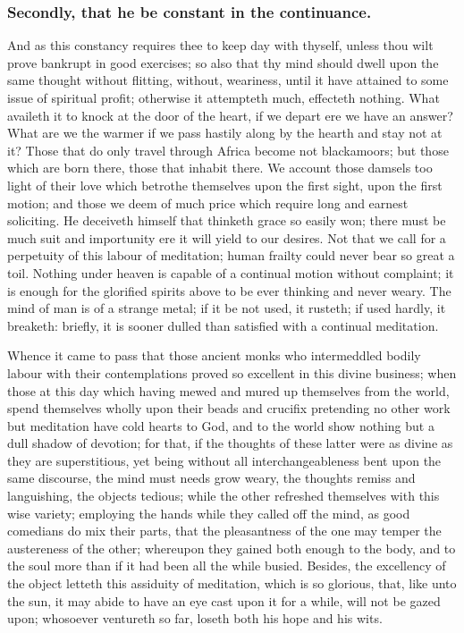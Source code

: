 \subsubsection{Secondly, that he be constant in the continuance.}
And as this constancy requires thee to keep day with thyself, unless thou wilt prove bankrupt in good exercises; so also that thy mind should dwell upon the same thought without flitting, without, weariness, until it have attained to some issue of spiritual profit; otherwise it attempteth much, effecteth nothing. What availeth it to knock at the door of the heart, if we depart ere we have an answer? What are we the warmer if we pass hastily along by the hearth and stay not at it? Those that do only travel through Africa become not blackamoors; but those which are born there, those that inhabit there. We account those damsels too light of their love which betrothe themselves upon the first sight, upon the first motion; and those we deem of much price which require long and earnest soliciting. He deceiveth himself that thinketh grace so easily won; there must be much suit and importunity ere it will yield to our desires. Not that we call for a perpetuity of this labour of meditation; human frailty could never bear so great a toil. Nothing under heaven is capable of a continual motion without complaint; it is enough for the glorified spirits above to be ever thinking and never weary. The mind of man is of a strange metal; if it be not used, it rusteth; if used hardly, it breaketh: briefly, it is sooner dulled than satisfied with a continual meditation. 

Whence it came to pass that those ancient monks who intermeddled bodily labour with their contemplations proved so excellent in this divine business; when those at this day which having mewed and mured up themselves from the world, spend themselves wholly upon their beads and crucifix pretending no other work but meditation have cold hearts to God, and to the world show nothing but a dull shadow of devotion; for that, if the thoughts of these latter were as divine as they are superstitious, yet being without all interchangeableness bent upon the same discourse, the mind must needs grow weary, the thoughts remiss and languishing, the objects tedious; while the other refreshed themselves with this wise variety; employing the hands while they called off the mind, as good comedians do mix their parts, that the pleasantness of the one may temper the austereness of the other; whereupon they gained both enough to the body, and to the soul more than if it had been all the while busied. Besides, the excellency of the object letteth this assiduity of meditation, which is so glorious, that, like unto the sun, it may abide to have an eye cast upon it for a while, will not be gazed upon; whosoever ventureth so far, loseth both his hope and his wits. 

